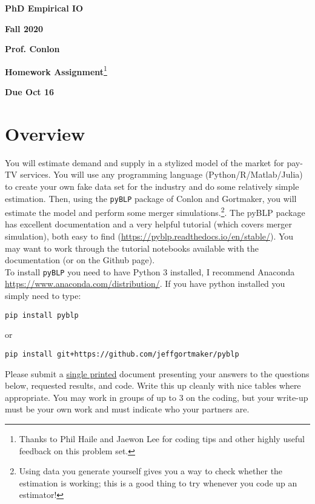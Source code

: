 \documentclass[english,11pt]{article}
\begin{document}
\begin{center}
\textbf{PhD Empirical IO}

\textbf{Fall 2020}

\textbf{Prof. Conlon}

\textbf{Homework Assignment}\footnote{Thanks to Phil Haile and Jaewon Lee for coding tips and other highly useful feedback on this problem set.}


\textbf{Due Oct 16}
\end{center}

\bigskip

\section*{Overview}

You will estimate demand and supply in a stylized model of the market for
pay-TV services. You will use any programming language (Python/R/Matlab/Julia) to create your own fake data set for the industry and do some
relatively simple estimation. Then, using the \texttt{pyBLP} package of Conlon and Gortmaker, you will
estimate the model and perform some merger simulations.\footnote{%
Using data you generate yourself gives you a way to check whether the
estimation is working; this is a good thing to try whenever you code up an
estimator!}. The pyBLP package has excellent
documentation and a very helpful tutorial (which covers merger simulation),
both easy to find (\url{https://pyblp.readthedocs.io/en/stable/}). You may want to work through the tutorial notebooks available with the documentation (or on the Github page).\\


To install \texttt{pyBLP} you need to have Python 3 installed, I recommend Anaconda \url{https://www.anaconda.com/distribution/}. If you have python installed you simply need to type:
\begin{verbatim}
pip install pyblp
\end{verbatim}
or 
\begin{verbatim}
pip install git+https://github.com/jeffgortmaker/pyblp
\end{verbatim}

Please submit a \underline{single printed} document presenting your answers to the questions below,
requested results, and code. Write this up cleanly with nice tables where appropriate.
You may work in groups of up to 3 on the coding, but your write-up must be your own work and must indicate who your partners are.
\end{document}
